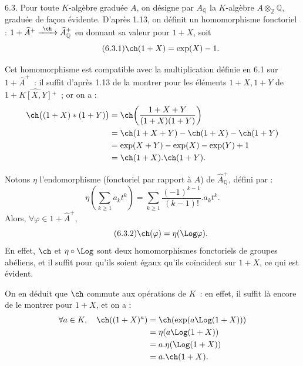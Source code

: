 
6.3.
Pour toute \(K\)-algèbre graduée \(A\), on désigne par \(A_{\mathbb Q}\) la \(K\)-algèbre \(A\otimes_{\mathbb Z}\mathbb Q\), graduée de façon évidente. D'après 1.13, on définit un homomorphisme fonctoriel : \(1+\widehat A^+\xrightarrow{\ \ch\ }\widehat A_{\mathbb Q}^{+}\) en donnant sa valeur pour \(1+X\), soit
\begin{equation}\tag{6.3.1}
  \ch(1+X)=\exp(X)-1.
\end{equation}

Cet homomorphisme est compatible avec la multiplication définie en 6.1 sur \(1+\widehat A^+\)~: il suffit d'après 1.13 de la montrer pour les éléments \(1+X,1+Y\) de \(1+\widehat{K[X,Y]}{}^{+}\)~; or on a :
\[
\begin{aligned}
 \ch\bigl((1+X)*(1+Y)\bigr)
 &= \ch\!\left(\frac{1+X+Y}{(1+X)(1+Y)}\right)\\
 &= \ch(1+X+Y)-\ch(1+X)-\ch(1+Y)\\
 &= \exp(X+Y)-\exp(X)-\exp(Y)+1\\
 &= \ch(1+X).\ch(1+Y).
\end{aligned}
\]

Notons \(\eta\) l'endomorphisme (fonctoriel par rapport à \(A\)) de \(\widehat A_{\mathbb Q}^{+}\), défini par :
\[
 \eta\!\left(\sum_{k\ge1} a_k t^k\right)
 =
 \sum_{k\ge1}\frac{(-1)^{k-1}}{(k-1)!}.a_k t^k.
\]
Alors, \(\forall\varphi\in1+\widehat A^+\),
\begin{equation}\tag{6.3.2}
  \ch(\varphi)=\eta(\Log\varphi).
\end{equation}
En effet, \(\ch\) et \(\eta\circ\Log\) sont deux homomorphismes fonctoriels de groupes abéliens, et il suffit pour qu'ils soient égaux qu'ils coïncident sur \(1+X\), ce qui est évident.

On en déduit que \(\ch\) commute aux opérations de \(K\)~: en effet, il suffit là encore de le montrer pour \(1+X\), et on a :
\[
\begin{aligned}
 \forall a\in K,\quad\ch((1+X)^a)
 &=\ch(\exp(a\Log(1+X)))\\
 &=\eta(a\Log(1+X))\\
 &=a.\eta(\Log(1+X))\\
 &=a.\ch(1+X).
\end{aligned}
\]
